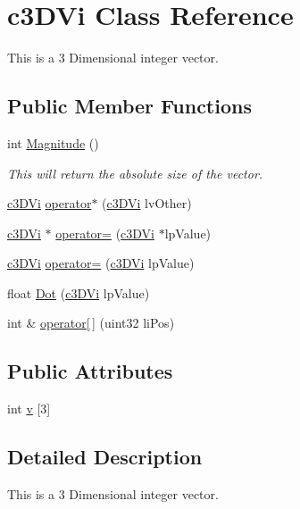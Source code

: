 \hypertarget{classc3_d_vi}{
\section{c3DVi Class Reference}
\label{classc3_d_vi}
}


This is a 3 Dimensional integer vector.  


\subsection*{Public Member Functions}
\begin{DoxyCompactItemize}
\item 
int \hyperlink{classc3_d_vi_a7ec516ee9fdf67fa8b2791a41038c114}{Magnitude} ()
\begin{DoxyCompactList}\small\item\em This will return the absolute size of the vector. \item\end{DoxyCompactList}\item 
\hyperlink{classc3_d_vi}{c3DVi} \hyperlink{classc3_d_vi_a619c6f38960b015ef1fc4d3cc93e5cf1}{operator$\ast$} (\hyperlink{classc3_d_vi}{c3DVi} lvOther)
\item 
\hyperlink{classc3_d_vi}{c3DVi} $\ast$ \hyperlink{classc3_d_vi_aa98c19c4b79a1df93cea37aca4e4f211}{operator=} (\hyperlink{classc3_d_vi}{c3DVi} $\ast$lpValue)
\item 
\hyperlink{classc3_d_vi}{c3DVi} \hyperlink{classc3_d_vi_a92630b65be02f0d85722fad0e880d898}{operator=} (\hyperlink{classc3_d_vi}{c3DVi} lpValue)
\item 
float \hyperlink{classc3_d_vi_a9fb16378b5ebfd7b5a3ad0b18b0c36fe}{Dot} (\hyperlink{classc3_d_vi}{c3DVi} lpValue)
\item 
int \& \hyperlink{classc3_d_vi_aa07e4840ce5b3061f667e69e4d240bd7}{operator\mbox{[}$\,$\mbox{]}} (uint32 liPos)
\end{DoxyCompactItemize}
\subsection*{Public Attributes}
\begin{DoxyCompactItemize}
\item 
int \hyperlink{classc3_d_vi_a9edd90fa066d6e2c5b8737d6df07fc9a}{v} \mbox{[}3\mbox{]}
\end{DoxyCompactItemize}


\subsection{Detailed Description}
This is a 3 Dimensional integer vector. 

